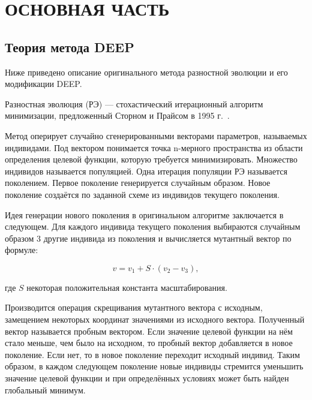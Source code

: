 \setcounter{figure}{0} \setcounter{table}{0} \setcounter{equation}{0}
\chapter*{ОСНОВНАЯ ЧАСТЬ}

\section*{Теория метода DEEP}

Ниже приведено описание оригинального метода разностной эволюции
и его модификации DEEP.

Разностная эволюция (РЭ) ---
стохастический итерационный алгоритм минимизации,
предложенный Сторном и Прайсом в 1995 г.~\cite{Storn95}.

Метод оперирует случайно сгенерированными векторами параметров,
называемых индивидами. 
Под вектором понимается точка n-мерного пространства
из области определения целевой функции,
которую требуется минимизировать.
Множество индивидов называется популяцией.
Одна итерация популяции РЭ называется поколением.
Первое поколение генерируется случайным образом.
Новое поколение создаётся
по заданной схеме из индивидов текущего поколения.

Идея генерации нового поколения в оригинальном алгоритме
заключается в следующем.
Для каждого индивида текущего поколения
выбираются случайным образом 3 другие индивида
из поколения и вычисляется мутантный вектор по формуле:

\begin{equation} \label{mutant}
    v = v_1 + S \cdot (v_2 - v_3),
\end{equation}

где \begin{math}S\end{math} некоторая положительная константа масштабирования.

Производится операция скрещивания мутантного вектора с исходным,
замещением некоторых координат значениями из исходного вектора.
Полученный вектор называется пробным вектором.
Если значение целевой функции на нём стало меньше,
чем было на исходном, то пробный вектор добавляется в новое поколение.
Если нет, то в новое поколение переходит исходный индивид.
Таким образом, в каждом следующем поколение новые индивиды
стремится уменьшить значение целевой функции
и при определённых условиях может быть найден глобальный минимум.

